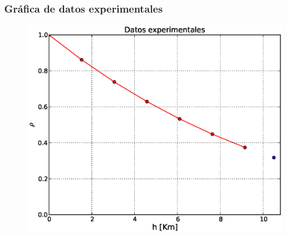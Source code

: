 \begin{frame}
\frametitle{Gr\'{a}fica de datos experimentales}
\begin{figure}
	\centering
	\includegraphics[scale=0.45]{Imagenes/Tarea_Raices_Problema_5_02.eps}
\end{figure}
\end{frame}
